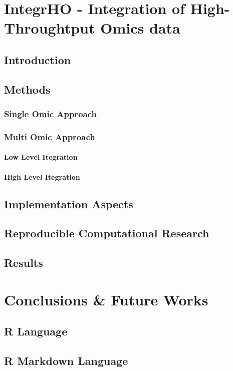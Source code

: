 \documentclass[b5paper,oneside,british,intoc,bibliograph=totoc,index=totoc,BCOR10mm,twoside,openright]{book}
\numberwithin{equation}{section}
\numberwithin{figure}{section}
\begin{document}
\chapter{IntegrHO - Integration of High-Throughtput Omics data}
\section{Introduction}
\section{Methods}
\subsection{Single Omic Approach}
\subsection{Multi Omic Approach}
\subsubsection{Low Level Itegration}
\subsubsection{High Level Itegration}
\section{Implementation Aspects}
\section{Reproducible Computational Research}
\section{Results}

\chapter{Conclusions \& Future Works}


\begin{appendices}
\section{R Language}
\section{R Markdown Language}
%
%
%
\end{appendices}
\end{document}
